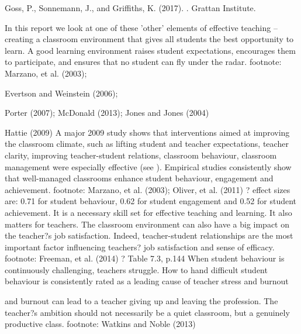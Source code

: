 
Goss, P., Sonnemann, J., and Griffiths, K. (2017). \emph{\mytitle}. Grattan Institute.

In this report we look at one of these 'other' elements of effective teaching -- creating a classroom environment that gives all students the best opportunity to learn. A good learning environment raises student expectations, encourages them to participate, and ensures that no student can fly under the radar.  
footnote: Marzano, et al. (2003); 

Evertson and Weinstein (2006); 

Porter (2007); McDonald (2013); Jones and Jones (2004)

{Hattie (2009)}
A major 2009 study shows that interventions aimed at improving the classroom climate, such as lifting student and teacher expectations, teacher clarity, improving teacher-student relations, classroom behaviour, classroom management were especially effective (see ). 
Empirical studies consistently show that well-managed classrooms enhance student behaviour, engagement and achievement. footnote: Marzano, et al. (2003); Oliver, et al. (2011) ? effect sizes are: 0.71 for student behaviour, 0.62 for student engagement and 0.52 for student achievement.
It is a necessary skill set for effective teaching and learning. %
It also matters for teachers. The classroom environment can also have a big impact on the teacher?s job satisfaction. Indeed, teacher-student relationships are the most important factor influencing teachers? job satisfaction and sense of efficacy.  footnote: Freeman, et al. (2014) ? Table 7.3, p.144
When student behaviour is continuously challenging, teachers struggle. How to hand difficult student behaviour is consistently rated as a leading cause of teacher stress and burnout  %

and burnout can lead to a teacher giving up and leaving the profession. %
The teacher?s ambition should not necessarily be a quiet classroom, but a genuinely productive class. footnote: Watkins and Noble (2013)

